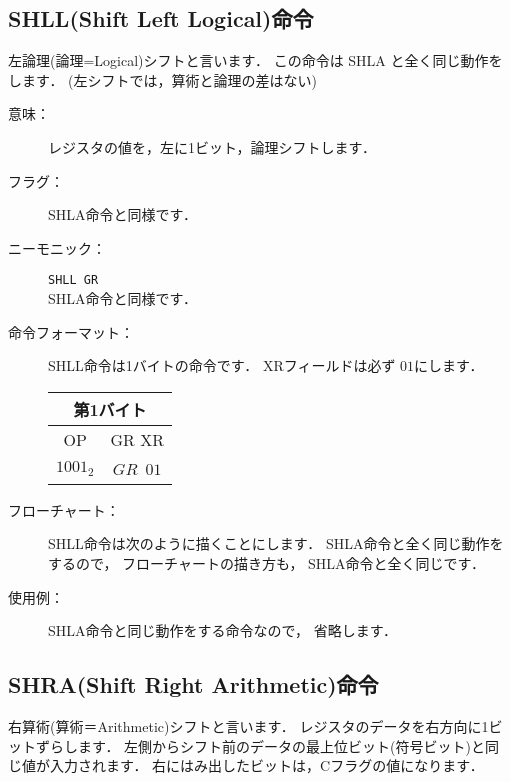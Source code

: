 \subsection{SHLL{\small (Shift Left Logical)}命令}
左論理(論理=Logical)シフトと言います．
この命令は SHLA と全く同じ動作をします．
(左シフトでは，算術と論理の差はない)

\begin{description}
\item[意味：]レジスタの値を，左に1ビット，論理シフトします．

\item[フラグ：]
SHLA命令と同様です．

\item[ニーモニック：]{\tt SHLL  GR} \\
SHLA命令と同様です．

\item[命令フォーマット：]SHLL命令は1バイトの命令です．
XRフィールドは必ず $01$にします．

\begin{tabular}{|c|c|} \hline
\multicolumn{2}{|c|}{第1バイト} \\
\hline
OP & GR XR \\
\hline
$1001_2$ & $GR$~$01$ \\
\hline
\end{tabular}

\item[フローチャート：]SHLL命令は次のように描くことにします．
SHLA命令と全く同じ動作をするので，
フローチャートの描き方も，
SHLA命令と全く同じです．

\begin{flushleft}
\epsfxsize=3cm
\end{flushleft}

\item[使用例：]
SHLA命令と同じ動作をする命令なので，
省略します．

\end{description}

\newpage
\subsection{SHRA{\small (Shift Right Arithmetic)}命令}
右算術(算術＝Arithmetic)シフトと言います．
レジスタのデータを右方向に1ビットずらします．
左側からシフト前のデータの最上位ビット(符号ビット)と同じ値が入力されます．
右にはみ出したビットは，Cフラグの値になります．

